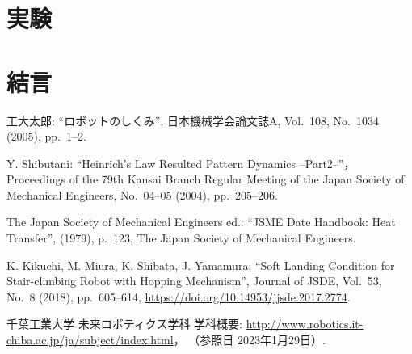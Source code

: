 \documentclass[10pt]{jarticle}
\begin{document}
    
    \section{実験}%
        
    \section{結\hspace{2zw}言}%
    
    \vspace{5truemm}
    {\footnotesize
        \begin{thebibliography}{99}
            
            工大太郎: ``ロボットのしくみ'', 
            日本機械学会論文誌A, 
            Vol.~108, No.~1034 (2005), pp.~1--2.
            
            Y. Shibutani: ``Heinrich's Law Resulted Pattern Dynamics --Part2--''，
            Proceedings of the 79th Kansai Branch Regular Meeting of the Japan Society of Mechanical Engineers,  
            No.~04--05 (2004), pp.~205--206.
            
            The Japan Society of Mechanical Engineers ed.: ``JSME Date Handbook: Heat Transfer'', 
            (1979), p.~123, The Japan Society of Mechanical Engineers.
            
            K. Kikuchi, M. Miura, K. Shibata, J. Yamamura: ``Soft Landing Condition for Stair-climbing Robot with Hopping Mechanism'', 
            Journal of JSDE, Vol.~53, No.~8 (2018), pp.~605--614, \url{https://doi.org/10.14953/jjsde.2017.2774}.
            
            千葉工業大学 未来ロボティクス学科 学科概要: 
            \url{http://www.robotics.it-chiba.ac.jp/ja/subject/index.html}， 
            （参照日 2023年1月29日）. 
            
        \end{thebibliography}
    }
    \normalsize
    
\end{document}
